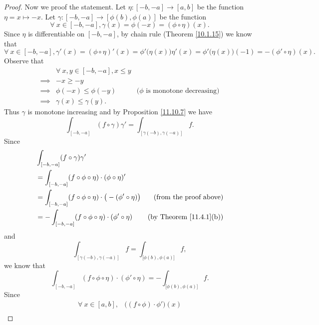\begin{proof}
    Now we proof the statement.
    Let \(\eta : [-b, -a] \to [a, b]\) be the function \(\eta = x \mapsto -x\).
    Let \(\gamma : [-b, -a] \to [\phi(b), \phi(a)]\) be the function
    \[
        \forall\ x \in [-b, -a], \gamma(x) = \phi(-x) = (\phi \circ \eta)(x).
    \]
    Since \(\eta\) is differentiable on \([-b, -a]\), by chain rule (Theorem \ref{10.1.15}) we know that
    \[
        \forall\ x \in [-b, -a], \gamma'(x) = (\phi \circ \eta)'(x) = \phi'\big(\eta(x)\big) \eta'(x) = \phi'\big(\eta(x)\big) (-1) = - (\phi' \circ \eta)(x).
    \]
    Observe that
    \begin{align*}
                 & \forall\ x, y \in [-b, -a], x \leq y                                            \\
        \implies & -x \geq -y                                                                      \\
        \implies & \phi(-x) \leq \phi(-y)               & \text{(\(\phi\) is monotone decreasing)} \\
        \implies & \gamma(x) \leq \gamma(y).
    \end{align*}
    Thus \(\gamma\) is monotone increasing and by Proposition \ref{11.10.7} we have
    \[
        \int_{[-b, -a]} (f \circ \gamma) \gamma' = \int_{[\gamma(-b), \gamma(-a)]} f.
    \]
    Since
    \begin{align*}
         & \int_{[-b, -a]} (f \circ \gamma) \gamma'                                                                              \\
         & = \int_{[-b, -a]} (f \circ \phi \circ \eta) \cdot (\phi \circ \eta)'                                                  \\
         & = \int_{[-b, -a]} (f \circ \phi \circ \eta) \cdot \big(-(\phi' \circ \eta)\big) & \text{(from the proof above)}       \\
         & = -\int_{[-b, -a]} (f \circ \phi \circ \eta) \cdot (\phi' \circ \eta)           & \text{(by Theorem \ref{11.4.1}(b))}
    \end{align*}
    and
    \[
        \int_{[\gamma(-b), \gamma(-a)]} f = \int_{\big[\phi(b), \phi(a)\big]} f,
    \]
    we know that
    \[
        \int_{[-b, -a]} (f \circ \phi \circ \eta) \cdot (\phi' \circ \eta) = -\int_{\big[\phi(b), \phi(a)\big]} f.
    \]
    Since
    \begin{align*}
        \forall\ x \in [a, b], & \big((f \circ \phi) \cdot \phi'\big)(x)                                                                   \\

\end{align*}
\end{proof}
